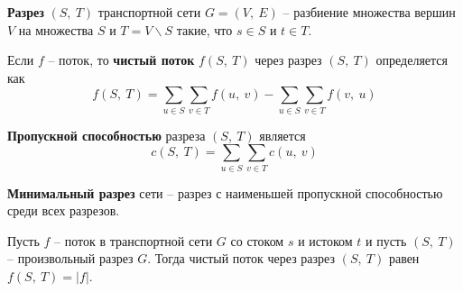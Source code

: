 \documentclass[a4paper,12pt]{article}
\begin{document}
\begin{definition}
    \textbf{Разрез} $(S,\ T)$ транспортной сети $G = (V,\ E)$ -- разбиение множества вершин $V$ на множества $S$ и $T = V \backslash S$ такие, что $s \in S$ и $t \in T$.
    
    Если $f$ -- поток, то \textbf{чистый поток} $f(S,\ T)$ через разрез $(S,\ T)$ определяется как\[f(S,\ T) = \sum\limits_{u \in S}\sum\limits_{v \in T}f(u,\ v) - \sum\limits_{u \in S}\sum\limits_{v \in T}f(v,\ u)\]
    
    \textbf{Пропускной способностью} разреза $(S,\ T)$ является \[c(S,\ T) = \sum\limits_{u \in S}\sum\limits_{v \in T}c(u,\ v)\]
    
    \textbf{Минимальный разрез} сети -- разрез с наименьшей пропускной способностью среди всех разрезов.
\end{definition}
\begin{fulllemma}
Пусть $f$ -- поток в транспортной сети $G$ со стоком $s$ и истоком $t$ и пусть $(S,\ T)$ -- произвольный разрез $G$. Тогда чистый поток через разрез $(S,\ T)$ равен $f(S,\ T) = |f|$.
\end{fulllemma}
\end{document}
